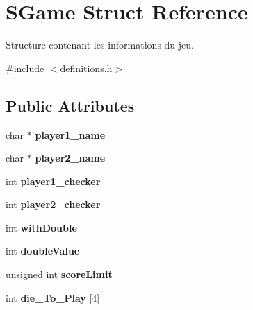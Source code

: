 \hypertarget{structSGame}{
\section{SGame Struct Reference}
\label{structSGame}
}


Structure contenant les informations du jeu.  




{\ttfamily \#include $<$definitions.h$>$}

\subsection*{Public Attributes}
\begin{DoxyCompactItemize}
\item 
\hypertarget{structSGame_a2908460ee5e257f6410bce325dc35e1a}{
char $\ast$ {\bfseries player1\_\-name}}
\label{structSGame_a2908460ee5e257f6410bce325dc35e1a}

\item 
\hypertarget{structSGame_a766db2792c5b85389548d63b633449b2}{
char $\ast$ {\bfseries player2\_\-name}}
\label{structSGame_a766db2792c5b85389548d63b633449b2}

\item 
\hypertarget{structSGame_ae2fefe93458b4565b864496d5bf156c7}{
int {\bfseries player1\_\-checker}}
\label{structSGame_ae2fefe93458b4565b864496d5bf156c7}

\item 
\hypertarget{structSGame_a6fa8c70d3011aaa6672bff0f23ec1a58}{
int {\bfseries player2\_\-checker}}
\label{structSGame_a6fa8c70d3011aaa6672bff0f23ec1a58}

\item 
\hypertarget{structSGame_ab62bb948221aec0ea884ed7934913002}{
int {\bfseries withDouble}}
\label{structSGame_ab62bb948221aec0ea884ed7934913002}

\item 
\hypertarget{structSGame_af83cf8d43e9edebcd4c4ceffe4e1343c}{
int {\bfseries doubleValue}}
\label{structSGame_af83cf8d43e9edebcd4c4ceffe4e1343c}

\item 
\hypertarget{structSGame_a5b6121c6fe57532c6a774985ee4c4ca5}{
unsigned int {\bfseries scoreLimit}}
\label{structSGame_a5b6121c6fe57532c6a774985ee4c4ca5}

\item 
\hypertarget{structSGame_a2514468fd5d2e66da55fed2d8da4c830}{
int {\bfseries die\_\-To\_\-Play} \mbox{[}4\mbox{]}}
\label{structSGame_a2514468fd5d2e66da55fed2d8da4c830}

\end{DoxyCompactItemize}


